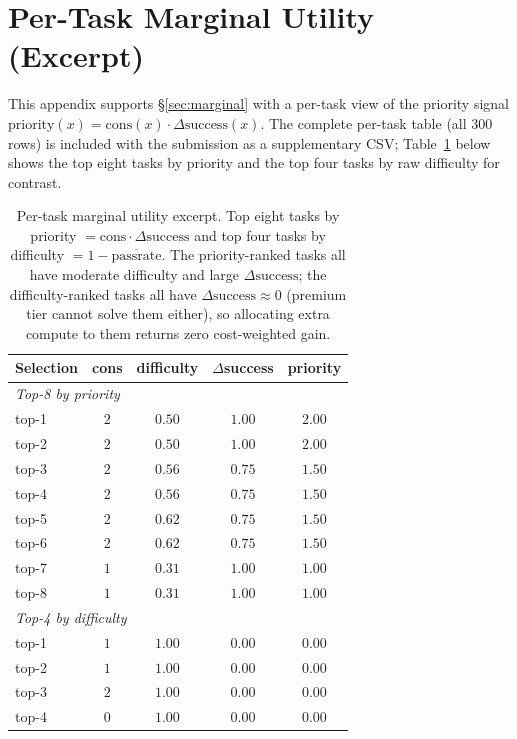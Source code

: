 \documentclass{article}
\begin{document}
\section{Per-Task Marginal Utility (Excerpt)}
\label{app:marginal}

This appendix supports \S\ref{sec:marginal} with a per-task view of
the priority signal
$\mathrm{priority}(x) = \mathrm{cons}(x) \cdot
\Delta\mathrm{success}(x)$. The complete per-task table (all $300$
rows) is included with the submission as a supplementary CSV;
Table~\ref{tab:marg} below shows the top eight tasks by priority and
the top four tasks by raw difficulty for contrast.

\begin{table}[h]
\centering
\caption{Per-task marginal utility excerpt. Top eight tasks by
priority $= \mathrm{cons}\cdot\Delta\mathrm{success}$ and top four
tasks by difficulty $= 1 - \overline{\mathrm{passrate}}$. The
priority-ranked tasks all have moderate difficulty and large
$\Delta\mathrm{success}$; the difficulty-ranked tasks all have
$\Delta\mathrm{success} \approx 0$ (premium tier cannot solve them
either), so allocating extra compute to them returns zero
cost-weighted gain.}
\label{tab:marg}
\small
\begin{tabular}{lcccc}
\toprule
Selection & cons & difficulty & $\Delta$success & priority \\
\midrule
\multicolumn{5}{l}{\textit{Top-8 by priority}} \\
top-1 & $2$ & $0.50$ & $1.00$ & $2.00$ \\
top-2 & $2$ & $0.50$ & $1.00$ & $2.00$ \\
top-3 & $2$ & $0.56$ & $0.75$ & $1.50$ \\
top-4 & $2$ & $0.56$ & $0.75$ & $1.50$ \\
top-5 & $2$ & $0.62$ & $0.75$ & $1.50$ \\
top-6 & $2$ & $0.62$ & $0.75$ & $1.50$ \\
top-7 & $1$ & $0.31$ & $1.00$ & $1.00$ \\
top-8 & $1$ & $0.31$ & $1.00$ & $1.00$ \\
\midrule
\multicolumn{5}{l}{\textit{Top-4 by difficulty}} \\
top-1 & $1$ & $1.00$ & $0.00$ & $0.00$ \\
top-2 & $1$ & $1.00$ & $0.00$ & $0.00$ \\
top-3 & $2$ & $1.00$ & $0.00$ & $0.00$ \\
top-4 & $0$ & $1.00$ & $0.00$ & $0.00$ \\
\bottomrule
\end{tabular}
\end{table}
\end{document}
